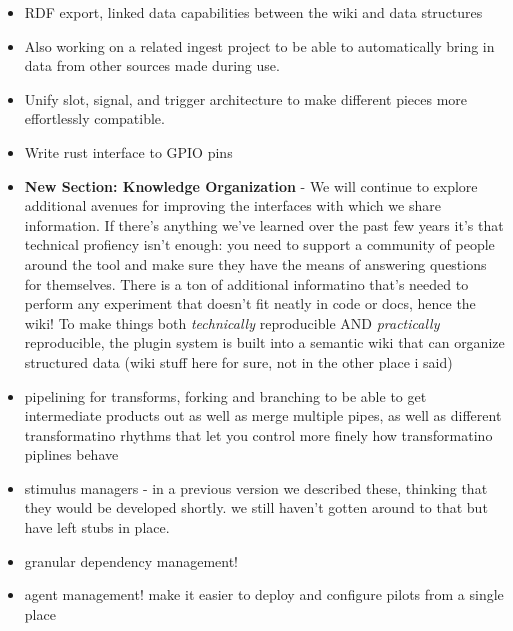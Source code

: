 \begin{itemize}
\item RDF export, linked data capabilities between the wiki and data structures
\item Also working on a related ingest project to be able to automatically bring in data from other sources made during use. 
\item Unify slot, signal, and trigger architecture to make different pieces more effortlessly compatible.
\item Write rust interface to GPIO pins
\item \textbf{New Section: Knowledge Organization} - We will continue to explore additional avenues for improving the interfaces with which we share information. If there's anything we've learned over the past few years it's that technical profiency isn't enough: you need to support a community of people around the tool and make sure they have the means of answering questions for themselves. There is a ton of additional informatino that's needed to perform any experiment that doesn't fit neatly in code or docs, hence the wiki! To make things both \textit{technically} reproducible AND \textit{practically} reproducible, the plugin system is built into a semantic wiki that can organize structured data (wiki stuff here for sure, not in the other place i said)
\item pipelining for transforms, forking and branching to be able to get intermediate products out as well as merge multiple pipes, as well as different transformatino rhythms that let you control more finely how transformatino piplines behave
\item stimulus managers - in a previous version we described these, thinking that they would be developed shortly. we still haven't gotten around to that but have left stubs in place.
\item granular dependency management!
\item agent management! make it easier to deploy and configure pilots from a single place
\end{itemize}



